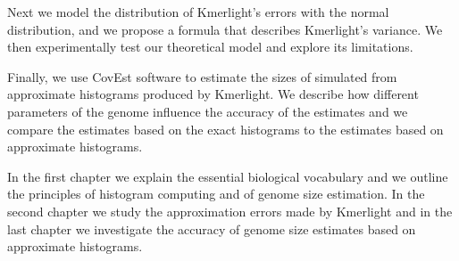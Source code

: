 Next we model the distribution of Kmerlight's errors with the normal distribution,
and we propose a formula that describes Kmerlight's variance. We then experimentally test
our theoretical model and explore its limitations.

Finally, we use CovEst software \cite{Hozza2015} to estimate the sizes of simulated
from approximate histograms produced by Kmerlight. We describe how different parameters of
the genome influence the accuracy of the estimates and we compare the estimates
based on the exact histograms to the estimates based on approximate histograms.

\medskip

In the first chapter we explain the essential biological vocabulary and
we outline the principles of histogram computing and of genome size estimation.
In the second chapter we study the approximation errors made by Kmerlight
and in the last chapter we investigate the accuracy of genome size estimates
based on approximate histograms.
